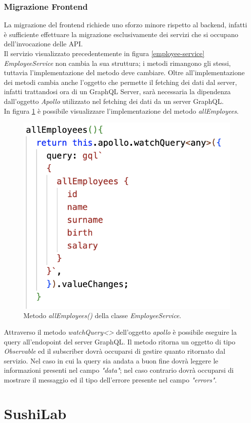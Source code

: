\subsubsection*{Migrazione Frontend}
La migrazione del frontend richiede uno sforzo minore rispetto al backend, infatti è sufficiente effettuare la migrazione esclusivamente dei servizi che si occupano dell'invocazione delle API.\\
Il servizio visualizzato precedentemente in figura \ref{employee-service} \textit{EmployeeService} non cambia la sua struttura; i metodi rimangono gli stessi, tuttavia l'implementazione del metodo deve cambiare. Oltre all'implementazione dei metodi cambia anche l'oggetto che permette il fetching dei dati dal server, infatti trattandosi ora di un GraphQL Server, sarà necessaria la dipendenza dall'oggetto \textit{Apollo} utilizzato nel fetching dei dati da un server GraphQL.\\
In figura \ref{employee-service-method-graphql} è possibile visualizzare l'implementazione del metodo  \textit{allEmployees}.
\FloatBarrier
\begin{figure}[!ht]
\centering
\includegraphics[width=0.5\linewidth]{immagini/employeeServiceMethodGraphql.png}
\caption{Metodo \textit{allEmployees()} della classe  \textit{EmployeeService}.}
\label{employee-service-method-graphql}
\end{figure}
\FloatBarrier
Attraverso il metodo \textit{watchQuery<>} dell'oggetto \textit{apollo} è possibile eseguire la query all'endopoint del server GraphQL. Il metodo ritorna un oggetto di tipo \textit{Observable} ed il subscriber dovrà occuparsi di gestire quanto ritornato dal servizio. Nel caso in cui la query sia andata a buon fine dovrà leggere le informazioni presenti nel campo \textit{"data"}; nel caso contrario dovrà occuparsi di mostrare il messaggio ed il tipo dell'errore presente nel campo \textit{"errors"}.
\section{SushiLab}
\label{sushi-lab}
